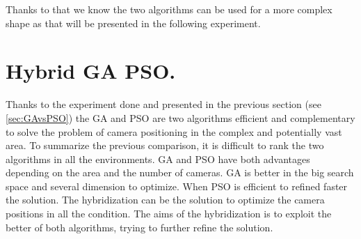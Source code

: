 Thanks to that we know the two algorithms can be used for a more complex shape as that will be presented in the following experiment.

 







\section{Hybrid GA PSO.}
 

Thanks to the experiment done and presented in the previous section (see \ref{sec:GAvsPSO}) the GA and PSO are two algorithms efficient and complementary to solve the problem of camera positioning in the complex and potentially vast area.
  To summarize the previous comparison, it is difficult to rank the two algorithms in all the environments. GA and PSO have both advantages depending on the area and the number of cameras. GA is better in the big search space and several dimension to optimize. When PSO is efficient to refined faster the solution.
 The hybridization can be the solution to optimize the camera positions in all the condition. The aims of the hybridization is to exploit the better of both algorithms, trying to further refine the solution. 


